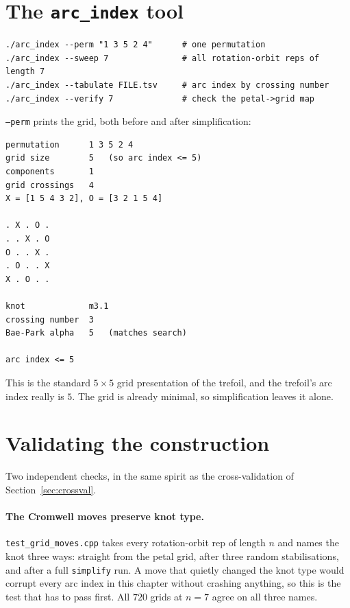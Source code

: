 \documentclass[11pt,oneside]{report}
\theoremstyle{definition}
\begin{document}
\section{The \texttt{arc\_index} tool}

\begin{lstlisting}[style=shell]
./arc_index --perm "1 3 5 2 4"      # one permutation
./arc_index --sweep 7               # all rotation-orbit reps of length 7
./arc_index --tabulate FILE.tsv     # arc index by crossing number
./arc_index --verify 7              # check the petal->grid map
\end{lstlisting}

\noindent
\texttt{--perm} prints the grid, both before and after simplification:

\begin{lstlisting}[style=shell]
permutation      1 3 5 2 4
grid size        5   (so arc index <= 5)
components       1
grid crossings   4
X = [1 5 4 3 2], O = [3 2 1 5 4]

. X . O .
. . X . O
O . . X .
. O . . X
X . O . .

knot             m3.1
crossing number  3
Bae-Park alpha   5   (matches search)

arc index <= 5
\end{lstlisting}

\noindent
This is the standard $5 \times 5$ grid presentation of the trefoil, and the
trefoil's arc index really is $5$. The grid is already minimal, so
simplification leaves it alone.

\section{Validating the construction}\label{sec:arc-validation}

Two independent checks, in the same spirit as the cross-validation of
Section~\ref{sec:crossval}.

\paragraph{The Cromwell moves preserve knot type.}
\texttt{test\_grid\_moves.cpp} takes every rotation-orbit rep of length $n$
and names the knot three ways: straight from the petal grid, after three
random stabilisations, and after a full \texttt{simplify} run. A move that
quietly changed the knot type would corrupt every arc index in this chapter
without crashing anything, so this is the test that has to pass first. All
$720$ grids at $n = 7$ agree on all three names.
\end{document}
